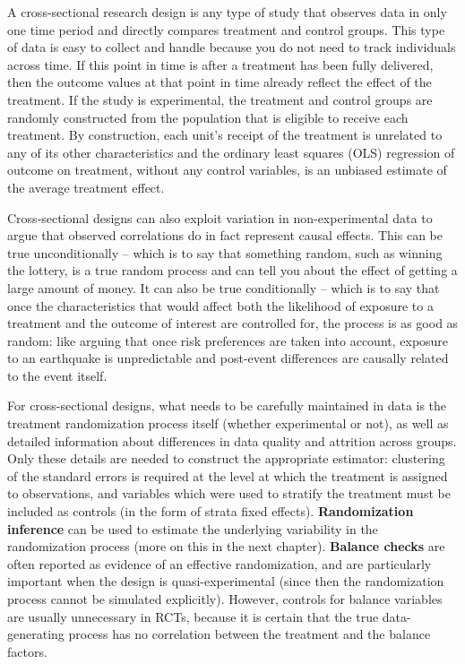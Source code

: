 A cross-sectional research design is any type of study
that observes data in only one time period
and directly compares treatment and control groups.
This type of data is easy to collect and handle because
you do not need to track individuals across time.
If this point in time is after a treatment has been fully delivered,
then the outcome values at that point in time
already reflect the effect of the treatment.
If the study is experimental, the treatment and control groups are randomly constructed
from the population that is eligible to receive each treatment.
By construction, each unit's receipt of the treatment
is unrelated to any of its other characteristics
and the ordinary least squares (OLS) regression
of outcome on treatment, without any control variables,
is an unbiased estimate of the average treatment effect.

Cross-sectional designs can also exploit variation in non-experimental data
to argue that observed correlations do in fact represent causal effects.
This can be true unconditionally -- which is to say that something random,
such as winning the lottery, is a true random process and can tell you about the effect
of getting a large amount of money.\cite{imbens2001estimating}
It can also be true conditionally -- which is to say that once the
characteristics that would affect both the likelihood of exposure to a treatment
and the outcome of interest are controlled for,
the process is as good as random:
like arguing that once risk preferences are taken into account,
exposure to an earthquake is unpredictable and post-event differences
are causally related to the event itself.\cite{callen2015catastrophes}

For cross-sectional designs, what needs to be carefully maintained in data
is the treatment randomization process itself (whether experimental or not),
as well as detailed information about differences
in data quality and attrition across groups.\cite{athey2017econometrics}
Only these details are needed to construct the appropriate estimator:
clustering of the standard errors is required at the level
at which the treatment is assigned to observations,
and variables which were used to stratify the treatment
must be included as controls (in the form of strata fixed effects).
\textbf{Randomization inference} can be used
to estimate the underlying variability in the randomization process
(more on this in the next chapter).
\textbf{Balance checks}
are often reported as evidence of an effective randomization,
and are particularly important when the design is quasi-experimental
(since then the randomization process cannot be simulated explicitly).
However, controls for balance variables are usually unnecessary in RCTs,
because it is certain that the true data-generating process
has no correlation between the treatment and the balance factors.

